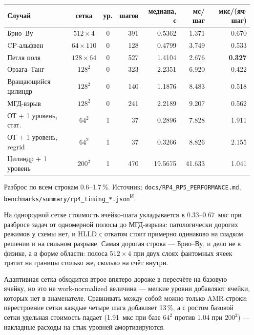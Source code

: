 \documentclass[12pt,a4paper]{article}
\newcommand{\code}[1]{\texttt{#1}}
\newcommand{\Iz}{\textsuperscript{\scriptsize И}}    %
\begin{document}
\begin{center}\footnotesize\setlength{\tabcolsep}{4pt}
\begin{tabular}{lccrrrr}
\toprule
Случай & сетка & ур. & шагов & медиана, с & мс/шаг & мкс/(яч$\cdot$шаг) \\
\midrule
Брио--Ву              & $512\times4$   & 0 & 391 & 0.5362 & 1.371 & 0.670 \\
CP-альфвен            & $64\times110$  & 0 & 128 & 0.4799 & 3.749 & 0.533 \\
Петля поля            & $128\times64$  & 0 & 527 & 1.4104 & 2.676 & \textbf{0.327} \\
Орзага--Танг          & $128^2$        & 0 & 323 & 2.2351 & 6.920 & 0.422 \\
Вращающийся цилиндр   & $128^2$        & 0 & 140 & 1.1876 & 8.483 & 0.518 \\
МГД-взрыв             & $128^2$        & 0 & 241 & 2.2189 & 9.207 & 0.562 \\
\midrule
ОТ + 1 уровень, стат. & $64^2$         & 1 & 37  & 0.2896 & 7.828 & 1.911 \\
ОТ + 1 уровень, regrid& $64^2$         & 1 & 37  & 0.3266 & 8.826 & 2.155 \\
Цилиндр + 1 уровень   & $200^2$        & 1 & 470 & 19.5675 & 41.633 & 1.041 \\
\bottomrule
\end{tabular}
\end{center}
\noindent\footnotesize
Разброс по всем строкам 0.6--1.7\,\%. Источник:
\code{docs/RP4\_RP5\_PERFORMANCE.md}, \code{benchmarks/summary/rp4\_timing\_*.json}\Iz.
\normalsize

\medskip
На однородной сетке стоимость ячейко-шага укладывается в 0.33--0.67~мкс при
разбросе задач от одномерной полосы до МГД-взрыва: патологически дорогих режимов
у схемы нет, и HLLD с откатом стоит примерно одинаково на гладком решении и на
сильном разрыве. Самая дорогая строка --- Брио--Ву, и дело не в физике, а в форме
области: полоса $512\times4$ при двух слоях фантомных ячеек тратит на границы
столько же, сколько на счёт внутри.

Адаптивная сетка обходится втрое-впятеро дороже в пересчёте на базовую ячейку,
но это не work-normalized величина --- мелкие уровни добавляют ячейки, которых
нет в знаменателе. Сравнивать между собой можно только AMR-строки: перестроение
сетки каждые четыре шага добавляет 13\,\%, а с ростом базовой сетки удельная
стоимость падает (1.91~мкс при базе $64^2$ против 1.04 при $200^2$) --- накладные
расходы на стык уровней амортизируются.
\end{document}
